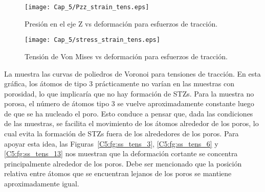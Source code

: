 \begin{figure}[H]
  \centering
	\texttt{[image: Cap\_5/Pzz\_strain\_tens.eps]}
	\caption[Presión en el eje Z vs deformación para esfuerzos de tracción]{Presión en el eje Z vs deformación para esfuerzos de tracción.}
	\label{C5:fg:PzzTens}
\end{figure}

\begin{figure}[H]
  \centering
	\texttt{[image: Cap\_5/stress\_strain\_tens.eps]}
	\caption[Tensión de Von Mises vs deformación para esfuerzos de tracción]{Tensión de Von Mises vs deformación para esfuerzos de tracción.}
	\label{C5:fg:stressTens}
  \label{C5:fg:stress}
\end{figure}

La  muestra las curvas de poliedros de Voronoi para tensiones de tracción. En esta gráfica, los átomos de tipo 3
prácticamente no varían en las muestras con porosidad, lo que implicaría que no hay formación de STZs. Para la muestra no porosa, el número de átomos tipo 3 se vuelve aproximadamente constante luego de que se ha nucleado el poro. Esto conduce a pensar que, dada las condiciones de las muestras, se facilita el movimiento de los átomos alrededor de los poros, lo cual evita la formación de STZs fuera de los alrededores de los poros. Para apoyar esta idea, las Figuras~\ref{C5:fg:ss_tens_3}, \ref{C5:fg:ss_tens_6} y \ref{C5:fg:ss_tens_13} nos muestran que la deformación cortante se concentra principalmente alrededor de los poros. Debe ser mencionado que la posición relativa entre átomos que se encuentran lejanos de los poros se mantiene aproximadamente igual.

